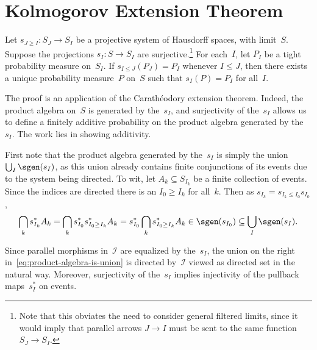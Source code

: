 \chapter	{Kolmogorov Extension Theorem}

\begin	{theorem}	
Let \( s_{J \ge I} \colon S_J \to S_I \)
be a projective system of Hausdorff spaces,
with limit~$S$.
Suppose the projections \( s_I \colon S \to S_I \) are surjective.\footnote
	{Note that this obviates the need to consider general
	filtered limits,
	since it would imply that parallel arrows \( J \to I \)
	must be sent to the same function \( S_J \to S_I \).}
For each~$I$, let $P_I$ be a tight probability measure on~$S_I$.
If \( s_{I \le J}(P_J) = P_I \) whenever \( I \le J \),
then there exists a unique probability measure~$P$ on~$S$ such that
\( s_I(P) = P_I \) for all~$I$.
\end	{theorem}
The proof is an application of the Carathéodory extension theorem.
Indeed, the product \sig algebra on~$S$ is generated by the~$s_I$,
and surjectivity of the~$s_I$ allows us to define a finitely additive
probability on the product algebra generated by the~$s_I$.
The work lies in showing \sig additivity.

First note that the product algebra generated by the~$s_I$
is simply the union
\( \bigcup_I \sgen(s_I) \),
as this union already contains finite conjunctions of its events
due to the system being directed.
To wit, let \( A_k \subseteq S_{I_k} \) be a finite collection of events.
Since the indices are directed there is an \( I_0 \ge I_k \) for all~$k$.
Then as \( s_{I_k} = s_{I_k \le I_0} s_{I_0} \),
\begin	{equation}
\label	{eq:product-algebra-is-union}
	\bigcap_k s_{I_k}^* A_k
		= \bigcap_k s_{I_0}^* s_{I_0 \ge I_k}^* A_k
		= s_{I_0}^* \bigcap_k s_{I_0 \ge I_k}^* A_k
		\in \sgen(s_{I_0})
		\subseteq \bigcup_I \sgen(s_I)
	\text.
\end	{equation}

Since parallel morphisms in~$\mathcal I$ are equalized by the~$s_I$,
the union on the right in~\eqref{eq:product-algebra-is-union}
is directed by~$\mathcal I$ viewed as directed set in the natural way.
Moreover, surjectivity of the~$s_I$ implies injectivity
of the pullback maps~$s_I^*$ on events.
